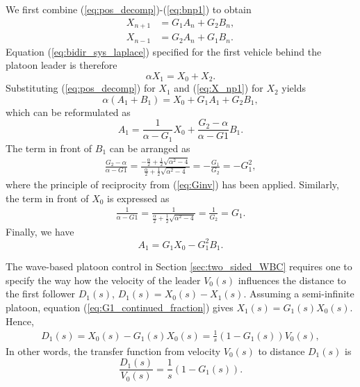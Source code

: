 \documentclass[final,5p,times,twocolumn]{elsarticle}
\begin{document}
We first combine (\ref{eq:pos_decomp})-(\ref{eq:bnp1}) to obtain
\begin{align}
  X_{n+1} &= G_{1}A_n + G_2B_n, \label{eq:X_np1}\\
  X_{n-1} &= G_{2}A_n + G_1B_n. \label{eq:X_nm1}
\end{align}
Equation (\ref{eq:bidir_sys_laplace}) specified for the first vehicle behind the platoon leader is therefore
\begin{equation}
  \alpha X_1 = X_{0} + X_2.
\end{equation}
Substituting (\ref{eq:pos_decomp}) for $X_1$  and (\ref{eq:X_np1}) for $X_2$ yields
\begin{equation}
  \alpha (A_1 + B_1) = X_{0} + G_1A_1 + G_2B_1,
\end{equation}
which can be reformulated as
\begin{equation}
  A_1 = \frac{1}{\alpha - G_1}X_{0} +\frac{G_2 - \alpha}{\alpha-G1} B_1.
\label{eq:A1_fixed_proof1}
\end{equation}
The term in front of $B_1$ can be arranged as
\begin{align}
  \frac{G_2 - \alpha}{\alpha-G1} = \frac{-\frac{\alpha}{2}+\frac{1}{2}\sqrt{\alpha^2-4}}{\frac{\alpha}{2} + \frac{1}{2}\sqrt{\alpha^2-4}} = -\frac{G_1}{G_2} = -G_1^2,
\end{align}
where the principle of reciprocity from (\ref{eq:Ginv}) has been applied. Similarly, the term in front of $X_{0}$ is expressed as
\begin{align}
  \frac{1}{\alpha-G1} = \frac{1}{\frac{\alpha}{2} + \frac{1}{2}\sqrt{\alpha^2-4}} = \frac{1}{G_2} = G_1.
\end{align}
Finally, we have
\begin{equation}
  A_1 = G_1 X_{0} - G_1^2 B_1.
\label{eq:forced_end_appendix}
\end{equation}

The wave-based platoon control in Section \ref{sec:two_sided_WBC} requires one to specify the way how the velocity of the leader $V_0(s)$ influences the distance to the first follower $D_1(s)$, $D_{1}(s) = X_{0}(s) - X_1(s)$. Assuming a semi-infinite platoon, equation (\ref{eq:G1_continued_fraction}) gives $X_1(s) = G_1(s) X_{0}(s)$. Hence,
\begin{align}
  D_{1}(s) = X_{0}(s) - G_1(s) X_{0}(s) = \frac{1}{s}(1-G_1(s)) V_0(s),
\end{align}
In other words, the transfer function from velocity $V_{0}(s)$ to distance $D_{1}(s)$ is
\begin{equation}
  \frac{D_1(s)}{V_0(s)} = \frac{1}{s}(1-G_1(s)).
  \label{eq:forced_end_dist_vel}
\end{equation}
\end{document}
